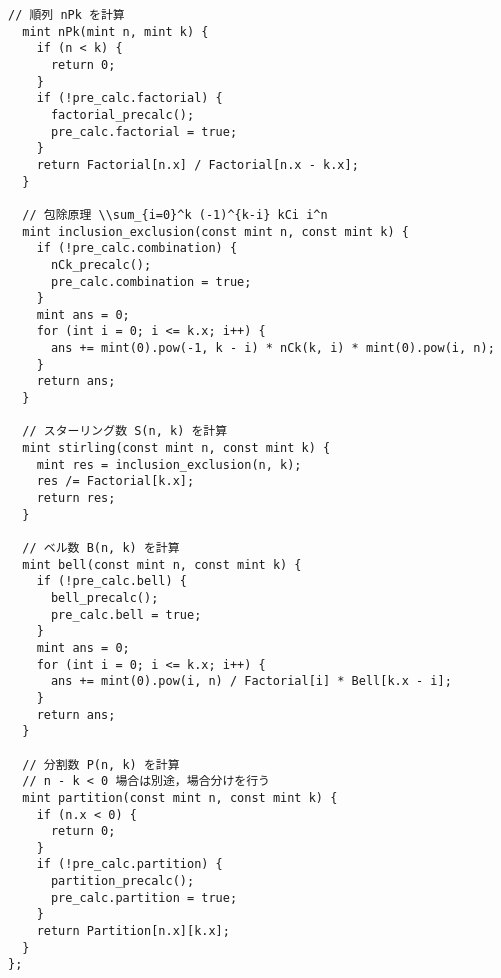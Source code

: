 \documentclass{jsarticle}
\begin{document}
\begin{lstlisting}[caption=Counting]
  // 順列 nPk を計算
  mint nPk(mint n, mint k) {
    if (n < k) {
      return 0;
    }
    if (!pre_calc.factorial) {
      factorial_precalc();
      pre_calc.factorial = true;
    }
    return Factorial[n.x] / Factorial[n.x - k.x];
  }

  // 包除原理 \\sum_{i=0}^k (-1)^{k-i} kCi i^n
  mint inclusion_exclusion(const mint n, const mint k) {
    if (!pre_calc.combination) {
      nCk_precalc();
      pre_calc.combination = true;
    }
    mint ans = 0;
    for (int i = 0; i <= k.x; i++) {
      ans += mint(0).pow(-1, k - i) * nCk(k, i) * mint(0).pow(i, n);
    }
    return ans;
  }

  // スターリング数 S(n, k) を計算
  mint stirling(const mint n, const mint k) {
    mint res = inclusion_exclusion(n, k);
    res /= Factorial[k.x];
    return res;
  }

  // ベル数 B(n, k) を計算
  mint bell(const mint n, const mint k) {
    if (!pre_calc.bell) {
      bell_precalc();
      pre_calc.bell = true;
    }
    mint ans = 0;
    for (int i = 0; i <= k.x; i++) {
      ans += mint(0).pow(i, n) / Factorial[i] * Bell[k.x - i];
    }
    return ans;
  }

  // 分割数 P(n, k) を計算
  // n - k < 0 場合は別途，場合分けを行う
  mint partition(const mint n, const mint k) {
    if (n.x < 0) {
      return 0;
    }
    if (!pre_calc.partition) {
      partition_precalc();
      pre_calc.partition = true;
    }
    return Partition[n.x][k.x];
  }
};

\end{lstlisting}

\color{white}
\end{document}
